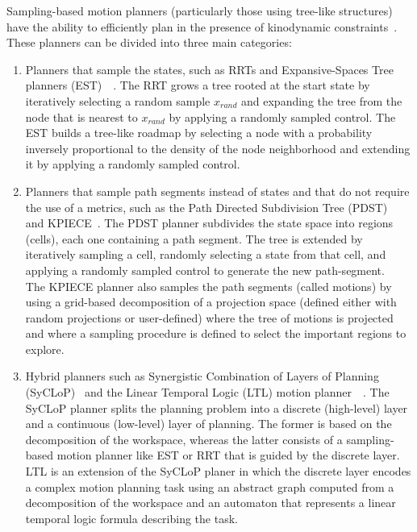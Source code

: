 \documentclass[twocolumn]{svjour3}          %
\begin{document}
 Sampling-based motion planners (particularly those using tree-like structures) have the ability to  efficiently plan in the presence of kinodynamic constraints~\cite{carpin2006}\cite{csucan2010}. 
These planners can be divided into three main categories:
 \begin{enumerate}
 \item Planners that sample the states, such as RRTs and Expansive-Spaces Tree planners (EST)~\cite{hsu2002}~\cite{hsu1997}.
 The RRT grows a tree rooted at the start state by iteratively selecting a random sample $x_{rand}$ and expanding the tree from the node that is nearest to  $x_{rand}$ by applying a randomly  sampled 
control. The EST builds a tree-like roadmap by selecting a
 node with a probability inversely proportional to the density of the node neighborhood and extending it by applying a randomly sampled control.

 \item Planners that sample path segments instead of states and that do not require the use of a metrics, such as the Path Directed Subdivision 
Tree (PDST)~\cite{ladd20051} and 
KPIECE~\cite{csucan2010}. The PDST planner subdivides the state space into regions (cells), each one containing a path segment. The tree is extended by iteratively sampling a cell, randomly selecting 
a state from that cell, and applying a randomly sampled control to generate the new path-segment. 
\\The KPIECE planner also samples the path segments (called motions) by using a grid-based decomposition 
of a projection space (defined either with random projections or user-defined) where the tree of motions is projected and where a sampling procedure is defined to select the important regions to 
explore.

 \item Hybrid planners such as Synergistic Combination of Layers of Planning (SyCLoP)~\cite{Plaku2010} and the Linear Temporal Logic (LTL) motion planner~\cite{bhatia2011}~\cite{plaku2012}. The SyCLoP 
planner splits the planning problem into a discrete (high-level) layer and a continuous (low-level) layer of planning. The former is based on the decomposition of the workspace, whereas the latter 
consists of a sampling-based motion planner like EST or RRT that is guided by the discrete layer. LTL is an extension of the SyCLoP planer in which the discrete layer encodes
     a complex motion planning task using an abstract graph computed from a decomposition of the workspace and an automaton that represents a linear temporal logic formula describing the task.
\end{enumerate}
\end{document}
